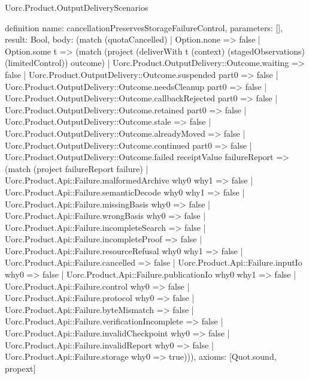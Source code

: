\begin{lexlean}{Uorc.Product.OutputDeliveryScenarios}
\begin{semanticmodule}
definition{
  name: cancellationPreservesStorageFailureControl,
  parameters: [],
  result: Bool,
  body: (match (quotaCancelled)
    | Option.none => false
    | Option.some t => (match (project (deliverWith t (context) (stagedObservations) (limitedControl)) outcome)
      | Uorc.Product.OutputDelivery::Outcome.waiting => false
      | Uorc.Product.OutputDelivery::Outcome.suspended part0 => false
      | Uorc.Product.OutputDelivery::Outcome.needsCleanup part0 => false
      | Uorc.Product.OutputDelivery::Outcome.callbackRejected part0 => false
      | Uorc.Product.OutputDelivery::Outcome.retained part0 => false
      | Uorc.Product.OutputDelivery::Outcome.stale => false
      | Uorc.Product.OutputDelivery::Outcome.alreadyMoved => false
      | Uorc.Product.OutputDelivery::Outcome.continued part0 => false
      | Uorc.Product.OutputDelivery::Outcome.failed receiptValue failureReport => (match (project failureReport failure)
        | Uorc.Product.Api::Failure.malformedArchive why0 why1 => false
        | Uorc.Product.Api::Failure.semanticDecode why0 why1 => false
        | Uorc.Product.Api::Failure.missingBasis why0 => false
        | Uorc.Product.Api::Failure.wrongBasis why0 => false
        | Uorc.Product.Api::Failure.incompleteSearch => false
        | Uorc.Product.Api::Failure.incompleteProof => false
        | Uorc.Product.Api::Failure.resourceRefusal why0 why1 => false
        | Uorc.Product.Api::Failure.cancelled => false
        | Uorc.Product.Api::Failure.inputIo why0 => false
        | Uorc.Product.Api::Failure.publicationIo why0 why1 => false
        | Uorc.Product.Api::Failure.control why0 => false
        | Uorc.Product.Api::Failure.protocol why0 => false
        | Uorc.Product.Api::Failure.byteMismatch => false
        | Uorc.Product.Api::Failure.verificationIncomplete => false
        | Uorc.Product.Api::Failure.invalidCheckpoint why0 => false
        | Uorc.Product.Api::Failure.invalidReport why0 => false
        | Uorc.Product.Api::Failure.storage why0 => true))),
  axioms: [Quot.sound, propext]
}


\end{semanticmodule}
\end{lexlean}
